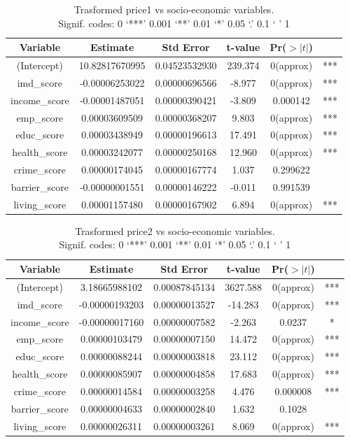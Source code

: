 \documentclass[12pt]{article}
\begin{document}
\begin{table}[H]
\centering
\begin{tabular}{c c c c c c} 
 \hline
 Variable & Estimate & Std Error & t-value & Pr($>|t|$) &   \\ [0.5ex] 
 \hline
 (Intercept) & 10.82817670995 & 0.04523532930 & 239.374 & 0(approx) & *** \\
 imd\_score & -0.00006253022 & 0.00000696566 & -8.977 & 0(approx) & *** \\
 income\_score & -0.00001487051 & 0.00000390421 & -3.809 & 0.000142 & *** \\
 emp\_score & 0.00003609509 & 0.00000368207 & 9.803 & 0(approx) & *** \\
 educ\_score & 0.00003438949 & 0.00000196613 & 17.491 & 0(approx) & *** \\
 health\_score & 0.00003242077 & 0.00000250168 & 12.960 & 0(approx) & *** \\
 crime\_score & 0.00000174045 & 0.00000167774 & 1.037 & 0.299622 &  \\
 barrier\_score & -0.00000001551 & 0.00000146222 & -0.011 & 0.991539 &  \\  
 living\_score & 0.00001157480 & 0.00000167902 & 6.894 & 0(approx) & *** \\ [1ex]
 \hline
\end{tabular}
\captionsetup{justification=centering}  
\caption{Trasformed \gls{price1} vs socio-economic variables.\\ Signif. codes:  0 `***' 0.001 `**' 0.01 `*' 0.05 `.' 0.1 ` ' 1}
\label{table:3}
\end{table}

\begin{table}[H]
\centering
\begin{tabular}{c c c c c c} 
 \hline
 Variable & Estimate & Std Error & t-value & Pr($>|t|$) &  \\ [0.5ex] 
 \hline
 (Intercept) & 3.18665988102 & 0.00087845134 & 3627.588 & 0(approx) & *** \\
 imd\_score & -0.00000193203 & 0.00000013527 & -14.283 & 0(approx) & *** \\
 income\_score & -0.00000017160 & 0.00000007582 & -2.263 & 0.0237 & * \\ 
 emp\_score & 0.00000103479 & 0.00000007150 & 14.472 & 0(approx) & *** \\
 educ\_score & 0.00000088244 & 0.00000003818 & 23.112 & 0(approx) & *** \\
 health\_score & 0.00000085907 & 0.00000004858 & 17.683 & 0(approx) & *** \\
 crime\_score & 0.00000014584 & 0.00000003258 & 4.476 & 0.000008 & *** \\
 barrier\_score & 0.00000004633 & 0.00000002840 & 1.632 & 0.1028 &  \\  
 living\_score & 0.00000026311 & 0.00000003261 & 8.069 & 0(approx) & *** \\ [1ex]
 \hline
\end{tabular}
\captionsetup{justification=centering}
\caption{Trasformed \gls{price2} vs socio-economic variables.\\Signif. codes:  0 `***' 0.001 `**' 0.01 `*' 0.05 `.' 0.1 ` ' 1}
\label{table:4}
\end{table}
\end{document}
